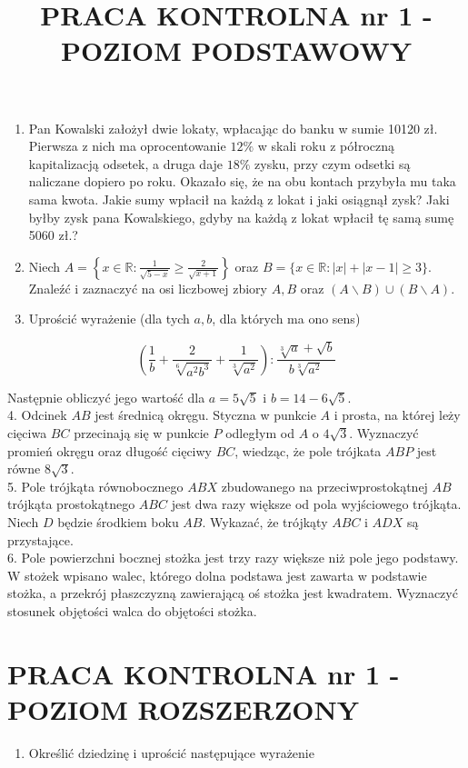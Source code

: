 \documentclass[10pt]{article}
\title{PRACA KONTROLNA nr 1 - POZIOM PODSTAWOWY }
\author{}
\date{}
\begin{document}
\maketitle
\begin{enumerate}
  \item Pan Kowalski założył dwie lokaty, wpłacając do banku w sumie 10120 zł. Pierwsza z nich ma oprocentowanie $12 \%$ w skali roku z półroczną kapitalizacją odsetek, a druga daje $18 \%$ zysku, przy czym odsetki są naliczane dopiero po roku. Okazało się, że na obu kontach przybyła mu taka sama kwota. Jakie sumy wpłacił na każdą z lokat i jaki osiągnął zysk? Jaki byłby zysk pana Kowalskiego, gdyby na każdą z lokat wpłacił tę samą sumę 5060 zł.?
  \item Niech $A=\left\{x \in \mathbb{R}: \frac{1}{\sqrt{5-x}} \geqslant \frac{2}{\sqrt{x+1}}\right\}$ oraz $B=\{x \in \mathbb{R}:|x|+|x-1| \geqslant 3\}$. Znaleźć i zaznaczyć na osi liczbowej zbiory $A, B$ oraz $(A \backslash B) \cup(B \backslash A)$.
  \item Uprościć wyrażenie (dla tych $a, b$, dla których ma ono sens)
\end{enumerate}

$$
\left(\frac{1}{b}+\frac{2}{\sqrt[6]{a^{2} b^{3}}}+\frac{1}{\sqrt[3]{a^{2}}}\right): \frac{\sqrt[3]{a}+\sqrt{b}}{b \sqrt[3]{a^{2}}}
$$

Następnie obliczyć jego wartość dla $a=5 \sqrt{5}$ i $b=14-6 \sqrt{5}$.\\
4. Odcinek $A B$ jest średnicą okręgu. Styczna w punkcie $A$ i prosta, na której leży cięciwa $B C$ przecinają się w punkcie $P$ odległym od $A$ o $4 \sqrt{3}$. Wyznaczyć promień okręgu oraz długość cięciwy $B C$, wiedząc, że pole trójkata $A B P$ jest równe $8 \sqrt{3}$.\\
5. Pole trójkąta równobocznego $A B X$ zbudowanego na przeciwprostokątnej $A B$ trójkąta prostokątnego $A B C$ jest dwa razy większe od pola wyjściowego trójkąta. Niech $D$ będzie środkiem boku $A B$. Wykazać, że trójkąty $A B C$ i $A D X$ są przystające.\\
6. Pole powierzchni bocznej stożka jest trzy razy większe niż pole jego podstawy. W stożek wpisano walec, którego dolna podstawa jest zawarta w podstawie stożka, a przekrój płaszczyzną zawierającą oś stożka jest kwadratem. Wyznaczyć stosunek objętości walca do objętości stożka.

\section*{PRACA KONTROLNA nr 1 - POZIOM ROZSZERZONY}
\begin{enumerate}
  \item Określić dziedzinę i uprościć następujące wyrażenie
\end{enumerate}
\end{document}
